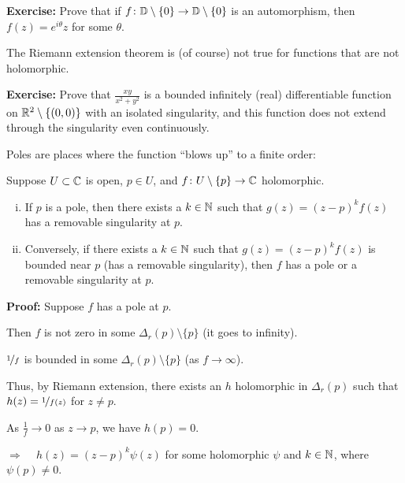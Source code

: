 \documentclass[10pt,aspectratio=169]{beamer}
\begin{document}
\begin{frame}

\textbf{Exercise:}
Prove that if $f \colon {\mathbb{D}} \setminus \{ 0 \} \to {\mathbb{D}} \setminus \{ 0 \}$
is an automorphism, then $f(z) = e^{i\theta} z$ for some $\theta$.

\bigskip
\pause

The Riemann extension theorem is (of course) not true for functions that are
not holomorphic.

\medskip
\pause

\textbf{Exercise:}
Prove that $\frac{xy}{x^2+y^2}$ is a bounded infinitely 
(real) differentiable function
on ${\mathbb{R}}^2 \setminus \{ (0,0) \}$ with an isolated singularity, and this
function does not
extend through the singularity even continuously.

\end{frame}

\begin{frame}
Poles are places where the function ``blows up'' to a finite order:

\pause

\begin{corollary}
Suppose $U \subset {\mathbb{C}}$ is open, $p \in U$,
and $f \colon U \setminus \{p\} \to {\mathbb{C}}$ holomorphic.
\pause
\begin{enumerate}[(i)]
\item
If $p$ is a pole, then there exists a $k \in {\mathbb{N}}$ such that
$g(z) = {(z-p)}^k f(z)$
has a removable singularity at $p$.
\pause
\item
Conversely, if there exists a $k \in {\mathbb{N}}$ such that
$g(z) = {(z-p)}^k f(z)$ is bounded near $p$ (has a removable singularity),
then $f$ has a pole or a
removable singularity at $p$.
\end{enumerate}
\end{corollary}

\pause
\textbf{Proof:}
Suppose $f$ has a pole at $p$.

\medskip
\pause

Then $f$ is not zero in some $\Delta_r(p) \setminus \{p\}$ (it goes to
infinity).

\medskip
\pause

$\nicefrac{1}{f}$ is bounded in some $\Delta_r(p) \setminus \{p\}$
(as $f \to \infty$).

\medskip
\pause

Thus, by Riemann extension, there exists an $h$ holomorphic in $\Delta_r(p)$
such that $h(z) = \nicefrac{1}{f(z)}$ for $z \not= p$.

\medskip
\pause

As $\frac{1}{f} \to 0$ as $z \to p$, we have $h(p) = 0$.

\medskip
\pause

$\Rightarrow$ ~ $h(z) = {(z-p)}^k \psi(z)$ for some holomorphic $\psi$ and $k \in {\mathbb{N}}$,
where $\psi(p) \not= 0$.

\end{frame}
\end{document}
